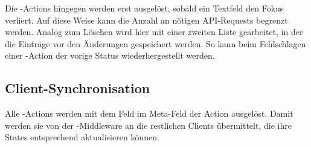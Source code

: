 Die -Actions hingegen werden erst ausgelöst, sobald ein Textfeld
den Fokus verliert.  Auf diese Weise kann die Anzahl an nötigen API-Requests
begrenzt werden.  Analog zum Löschen wird hier mit einer zweiten Liste
gearbeitet, in der die Einträge vor den Änderungen gespeichert werden.  So kann
beim Fehlschlagen einer -Action der vorige
Status wiederhergestellt werden.

\subsection{Client-Synchronisation}
\label{ssec:fc_client_synchronisation}

Alle -Actions werden mit dem Feld  im
Meta-Feld der Action ausgelöst.  Damit werden sie von der
-Middleware an die restlichen Clients übermittelt, die ihre
States entsprechend aktualisieren können.
